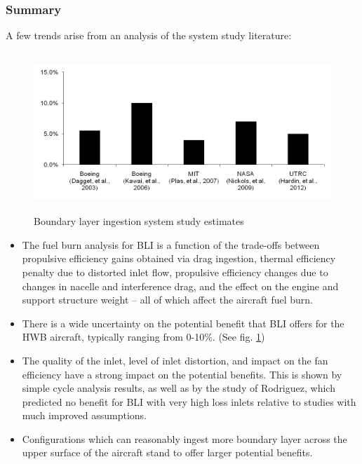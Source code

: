 \documentclass[12pt]{gatech-thesis}
\begin{document}
\subsubsection{Summary}
\indent A few trends arise from an analysis of the system study literature:

\begin{figure}[hptb]
\centering
\includegraphics[width=120mm, height =60mm]{Figure4_System_Study_Estimates.png}
\caption{Boundary layer ingestion system study estimates}
\label{System_Estimates}
\end{figure}

\begin{itemize}
\item{The fuel burn analysis for BLI is a function of the trade-offs between propulsive efficiency gains obtained via drag ingestion, thermal efficiency penalty due to distorted inlet flow, propulsive efficiency changes due to changes in nacelle and interference drag, and the effect on the engine and support structure weight -- all of which affect the aircraft fuel burn.}
\item{There is a wide uncertainty on the potential benefit that BLI offers for the HWB aircraft, typically ranging from 0-10\%. (See fig. \ref{System_Estimates})}
\item{The quality of the inlet, level of inlet distortion, and impact on the fan efficiency have a strong impact on the potential benefits.  This is shown by simple cycle analysis results, as well as by the study of Rodriguez, which predicted no benefit for BLI with very high loss inlets relative to studies with much improved assumptions.}
\item{Configurations which can reasonably ingest more boundary layer across the upper surface of the aircraft stand to offer larger potential benefits.}
\end{itemize}
\end{document}
